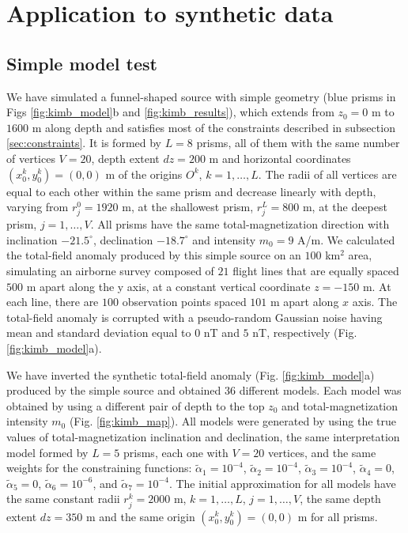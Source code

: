 \section{Application to synthetic data}

\subsection{Simple model test}

We have simulated a funnel-shaped source with simple geometry (blue prisms in Figs \ref{fig:kimb_model}b and \ref{fig:kimb_results}), which extends from $z_0=0$ m to $1600$ m along depth and satisfies most of the constraints described in subsection \ref{sec:constraints}. It is formed by $L=8$ prisms, all of them with the same number of vertices $ V = 20 $, depth extent $ dz = 200 $ m and horizontal coordinates $ (x_0^k, y_0^k) = (0, 0) $ m of the origins $O^k$, $k=1,\dots,L$. The radii of all vertices are equal to each other within the same prism and decrease linearly with depth, varying from $r_j^0=1920$ m, at the shallowest prism, $r_j^L=800$ m, at the deepest prism, $j=1,\dots, V$. All prisms have the same total-magnetization direction with inclination $ -21.5^\circ $, declination $ -18.7^\circ $ and intensity $ m_0 = 9 $ A/m. We calculated the total-field anomaly produced by this simple source on an $ 100 $ km$^2$ area, simulating an airborne survey composed of $ 21 $ flight lines that are equally spaced $ 500 $ m apart along the y axis, at a constant vertical coordinate $ z = -150 $ m. At each line, there are $ 100 $ observation points spaced $101$ m apart along $ x $ axis. The total-field anomaly is corrupted with a pseudo-random Gaussian noise having mean and standard deviation equal to $ 0 $ nT and $ 5 $ nT, respectively (Fig. \ref{fig:kimb_model}a).

We have inverted the synthetic total-field anomaly (Fig. \ref{fig:kimb_model}a) produced by the simple source and obtained 36 different models. Each model was obtained by using a different pair of depth to the top $ z_0 $ and total-magnetization intensity $ m_0 $ (Fig. \ref{fig:kimb_map}). All models were generated by using the true values of total-magnetization inclination and declination, the same interpretation model formed by $ L = 5 $ prisms, each one with $ V = 20 $ vertices, and the same weights for the constraining functions: $\tilde{\alpha}_1 = 10^{-4}$, $\tilde{\alpha}_2 = 10^{-4}$, $\tilde{\alpha}_3 = 10^{-4}$, $\tilde{\alpha}_4 = 0$, $\tilde{\alpha}_5 = 0$, $\tilde{\alpha}_6 = 10^{-6}$, and $\tilde{\alpha}_7 = 10^{-4}$. The initial approximation for all models have the same constant radii $ r^k_j = 2000 $ m, $ k = 1, \dots, L $, $ j  = 1, \dots, V $, the same depth extent $ dz = 350 $ m and the same origin $(x^k_0, y^k_0) = (0, 0) $ m for all prisms.

